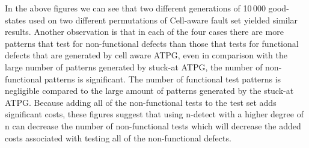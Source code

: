 \documentclass[12pt]{article}
\begin{document}
In the above figures we can see that two different generations of 10\,000 good-states used on two different permutations of Cell-aware fault set yielded similar results. Another observation is that in each of the four cases there are more patterns that test for non-functional defects than those that tests for functional defects that are generated by cell aware ATPG, even in comparison with the large number of patterns generated by stuck-at ATPG, the number of non-functional patterns is significant. The number of functional test patterns is negligible compared to the large amount of patterns generated by the stuck-at ATPG. Because adding all of the non-functional tests to the test set adds significant costs, these figures suggest that using n-detect with a higher degree of n can decrease the number of non-functional tests which will decrease the added costs associated with testing all of the non-functional defects. 
\end{document}
